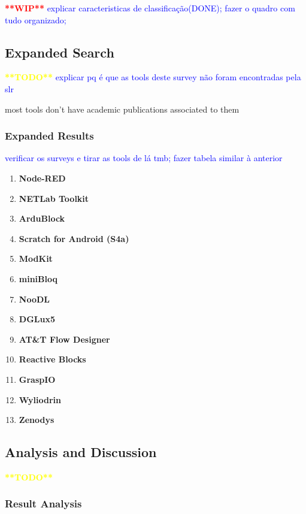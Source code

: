 \textcolor{red}{\textbf{**WIP**}}
\textcolor{blue}{explicar caracteristicas de classificação(DONE); fazer o quadro com tudo organizado;}



\subsection{Expanded Search}

\textcolor{yellow}{\textbf{**TODO**}}
\textcolor{blue}{explicar pq é que as tools deste survey não foram encontradas pela slr}

most tools don't have academic publications associated to them

\subsubsection{Expanded Results}

\textcolor{blue}{verificar os surveys e tirar as tools de lá tmb; fazer tabela similar à anterior}


\cite{survey_vpl_iot}
\begin{enumerate}
    \item \textbf{Node-RED}
    \item \textbf{NETLab Toolkit}
    \item \textbf{ArduBlock}
    \item \textbf{Scratch for Android (S4a)}
    \item \textbf{ModKit}
    \item \textbf{miniBloq}
    \item \textbf{NooDL}
    \item \textbf{DGLux5}
    \item \textbf{AT\&T Flow Designer}
    \item \textbf{Reactive Blocks}
    \item \textbf{GraspIO}
    \item \textbf{Wyliodrin}
    \item \textbf{Zenodys}
\end{enumerate}

\subsection{Analysis and Discussion}

\textcolor{yellow}{\textbf{**TODO**}}

\subsubsection{Result Analysis}

